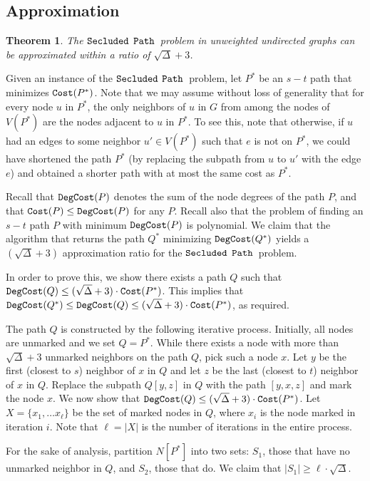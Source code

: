 \documentclass[12pt]{article}
\newtheorem{theorem}{Theorem}[section]
\def\Cost{\mbox{\tt Cost}}
\def\Proof{\par\noindent{\bf Proof:~}}
\newcommand{\MAXDEG}[0]{\Delta}
\newcommand{\PP}[0]{$\mbox{\tt Secluded}$ $\mbox{\tt Path}$}
\def\Cost{\mbox{\tt Cost}}
\def\DegCost{\mbox{\tt DegCost}}
\begin{document}
\subsection{Approximation}
\begin{theorem}
\label{thm:delta_approx}
The \PP\ problem in unweighted undirected graphs can be approximated within a ratio of $\sqrt{\MAXDEG}+3$.
\end{theorem}
\Proof
Given an instance of the \PP\ problem, let $P^*$ be an $s-t$ path that minimizes $\Cost(P^{*})$. Note that we may assume without loss of generality that for every node $u$ in $P^*$, the only neighbors of $u$ in $G$ from among the nodes of $V(P^{*})$ are the nodes adjacent to $u$ in $P^*$. To see this, note that otherwise, if $u$ had an edges to some neighbor $u' \in V(P^{*})$ such that $e$ is not on $P^{*}$, we could have shortened the path $P^{*}$ (by replacing the subpath from $u$ to $u'$ with the edge $e$) and obtained a shorter path with at most the same cost as $P^*$.

Recall that $\DegCost(P)$ denotes the sum of the node degrees of the path $P$, and that $\Cost(P) \leq \DegCost(P)$ for any $P$. Recall also that the problem of finding an $s-t$ path $P$ with minimum $\DegCost(P)$ is polynomial. We claim that the algorithm that returns the path $Q^*$ minimizing $\DegCost(Q^*)$ yields a $(\sqrt{\MAXDEG}+3)$ approximation ratio for the \PP\ problem.

In order to prove this, we show there exists a path $Q$ such that $\DegCost(Q) \leq (\sqrt{\MAXDEG}+3) \cdot \Cost(P^{*})$.
This implies that $\DegCost(Q^*) \leq \DegCost(Q) \leq (\sqrt{\MAXDEG}+3) \cdot \Cost(P^{*})$, as required.

The path $Q$ is constructed by the following iterative process.
Initially, all nodes are unmarked and we set $Q =P^*$.
While there exists a node with more than $\sqrt{\MAXDEG}+3$ unmarked neighbors on the path $Q$, pick such a node $x$.
Let $y$ be the first (closest to $s$) neighbor of $x$ in $Q$ and let $z$ be the last (closest to $t$) neighbor of $x$ in $Q$.
Replace the subpath $Q[y,z]$ in $Q$ with the path $[y,x,z]$ and mark the node $x$.
We now show that $\DegCost(Q) \leq (\sqrt{\MAXDEG}+3) \cdot \Cost(P^{*})$.
Let $X=\{x_1, \ldots x_\ell\}$ be the set of marked nodes in $Q$, where $x_i$ is the node marked in iteration $i$.
Note that $\ell=|X|$ is the number of iterations in the entire process.

For the sake of analysis, partition $N[P^*]$ into two sets: $S_1$, those that have no unmarked neighbor in $Q$, and $S_2$, those that do.
We claim that $|S_1| \geq \ell \cdot \sqrt{\MAXDEG}$.
\end{document}
